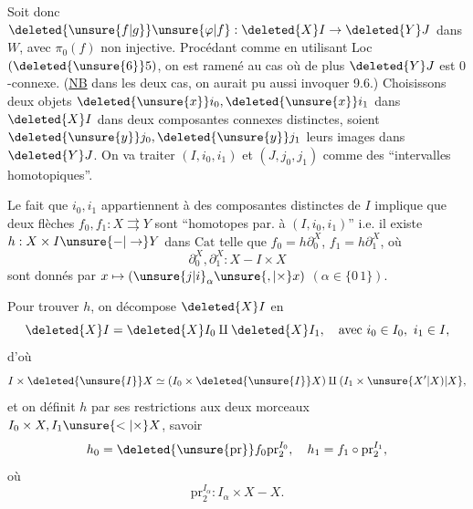 
Soit donc $\deleted{\unsure{f|g}}\unsure{\varphi|f}:\deleted{X}I\to\deleted{Y}J$ dans $W$, avec $\pi_0(f)$ non injective. Procédant comme  en utilisant Loc $(\deleted{\unsure{6}}5)$, on est ramené au cas où de plus $\deleted{Y}J$ est $0$-connexe. (\uline{NB} dans les deux cas, on aurait pu aussi invoquer 9.6.)  Choisissons deux objets $\deleted{\unsure{x}}i_0,\deleted{\unsure{x}}i_1$ dans $\deleted{X}I$ dans deux composantes connexes distinctes, soient $\deleted{\unsure{y}}j_0,\deleted{\unsure{y}}j_1$ leurs images dans $\deleted{Y}J$. On va traiter $(I,i_0,i_1)$ et $(J,j_0,j_1)$ comme des ``intervalles homotopiques''.

Le fait que $i_0,i_1$ appartiennent à des composantes distinctes de $I$ implique que deux flèches $f_0,f_1:X\rightrightarrows Y$ sont ``homotopes par. à $(I,i_0,i_1)$'' i.e. il existe $h:X\times I\unsure{-|\to}Y$ dans $\mathrm{Cat}$ telle que $f_0=h\partial_0^X$, $f_1=h\partial_1^X$, où
\[
 \partial_0^X,\partial_1^X:X-I\times X
\]
sont donnés par $x\mapsto(\unsure{j|i}_\alpha\unsure{,|\times}x)$ $(\alpha\in\{0\,1\})$.

Pour trouver $h$, on décompose $\deleted{X}I$ en
\[
 \deleted{X}I=\deleted{X}I_0\amalg\deleted{X}I_1,\quad\text{avec } i_0\in I_0,\ i_1\in I,
\]
d'où
\[
 I\times \deleted{\unsure{I}}X\simeq(I_0\times \deleted{\unsure{I}}X)\amalg(I_1\times\unsure{X'|X)|X},
\]
et on définit $h$ par ses restrictions  aux deux morceaux $I_0\times X,I_1\unsure{<|\times}X$, savoir
\[
 h_0=\deleted{\unsure{\mathrm{pr}}}f_0\mathrm{pr}_2^{I_0},\quad
 h_1=f_1\circ\mathrm{pr}_2^{I_1},
\]
où
\[
 \mathrm{pr}_2^{I_\alpha}:I_\alpha\times X-X.
\]
